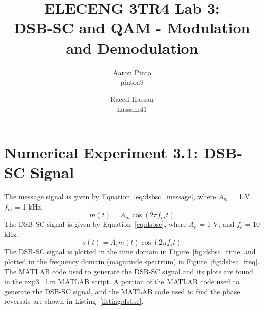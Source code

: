 \documentclass[12pt]{article}
\title{ELECENG 3TR4 Lab 3: \\ DSB-SC and QAM - Modulation and Demodulation}
\author{
    Aaron Pinto \\ pintoa9
    \and
    Raeed Hassan \\ hassam41
}
\begin{document}
\maketitle
\clearpage

\section*{Numerical Experiment 3.1: DSB-SC Signal}
The message signal is given by Equation~\ref{eq:dsbsc_message}, where $A_m$ = 1 V, $f_m$ = 1 kHz.
\begin{equation} \label{eq:dsbsc_message} 
    m(t) = A_m \cos(2 \pi f_m t)
\end{equation}
The DSB-SC signal is given by Equation~\ref{eq:dsbsc}, where $A_c$ = 1 V, and $f_c$ = 10 kHz.
\begin{equation} \label{eq:dsbsc}
    s(t) = A_c m(t) \cos(2 \pi f_c t)    
\end{equation}
The DSB-SC signal is plotted in the time domain in Figure~\ref{fig:dsbsc_time} and plotted in the frequency domain (magnitude spectrum) in Figure~\ref{fig:dsbsc_freq}. The MATLAB code used to generate the DSB-SC signal and its plots are found in the exp3\_1.m MATLAB script. A portion of the MATLAB code used to generate the DSB-SC signal, and the MATLAB code used to find the phase reversals are shown in Listing~\ref{listing:dsbsc}.
 
\end{document}
